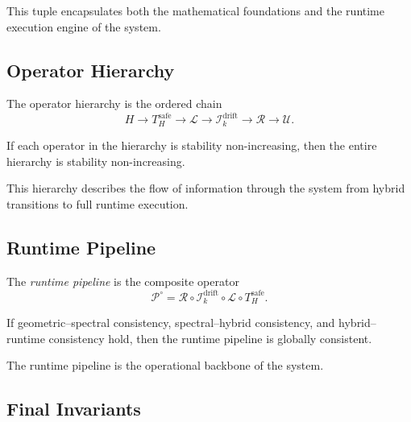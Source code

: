 \documentclass[11pt]{article}
\begin{document}
\begin{remark}
This tuple encapsulates both the mathematical foundations and the runtime
execution engine of the system.
\end{remark}

\subsection{Operator Hierarchy}

\begin{definition}
The operator hierarchy is the ordered chain
\[
H
\longrightarrow
T_H^\mathrm{safe}
\longrightarrow
\mathcal{L}
\longrightarrow
\mathcal{I}_k^\mathrm{drift}
\longrightarrow
\mathcal{R}
\longrightarrow
\mathcal{U}.
\]
\end{definition}

\begin{lemma}
If each operator in the hierarchy is stability non-increasing, then the
entire hierarchy is stability non-increasing.
\end{lemma}

\begin{remark}
This hierarchy describes the flow of information through the system from
hybrid transitions to full runtime execution.
\end{remark}

\subsection{Runtime Pipeline}

\begin{definition}
The \emph{runtime pipeline} is the composite operator
\[
\mathcal{P}^\circ
= \mathcal{R} \circ \mathcal{I}_k^\mathrm{drift}
\circ \mathcal{L} \circ T_H^\mathrm{safe}.
\]
\end{definition}

\begin{lemma}
If geometric--spectral consistency, spectral--hybrid consistency, and
hybrid--runtime consistency hold, then the runtime pipeline is globally
consistent.
\end{lemma}

\begin{remark}
The runtime pipeline is the operational backbone of the system.
\end{remark}

\subsection{Final Invariants}
\end{document}
